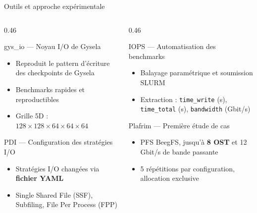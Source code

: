 \documentclass[svgnames,9pt,aspectratio=169]{beamer}
\begin{document}
\begin{frame}{Outils et approche expérimentale}

  \vspace{0.5em}

  \begin{columns}[t]
    \begin{column}{0.46\textwidth}
      \begin{block}{gys\_io --- Noyau I/O de Gysela}
        \begin{itemize}
          \item Reproduit le pattern d'écriture des checkpoints de Gysela
          \item Benchmarks rapides et reproductibles
          \item Grille 5D : $128 \times 128 \times 64 \times 64 \times 64$
        \end{itemize}
      \end{block}

      \vspace{0.8em}

      \begin{block}{PDI --- Configuration des stratégies I/O}
        \begin{itemize}
          \item Stratégies I/O changées via \textbf{fichier YAML}
          \item Single Shared File (SSF), Subfiling, File Per Process (FPP)
        \end{itemize}
      \end{block}
    \end{column}
    \begin{column}{0.46\textwidth}
      \begin{block}{IOPS --- Automatisation des benchmarks}
        \begin{itemize}
          \item Balayage paramétrique et soumission SLURM
          \item Extraction : \texttt{time\_write} (s), \texttt{time\_total} (s), \texttt{bandwidth} (Gbit/s)
        \end{itemize}
      \end{block}

      \vspace{0.8em}

      \begin{exampleblock}{Plafrim --- Première étude de cas}
        \begin{itemize}
          \item PFS BeegFS, jusqu'à \textbf{8 OST} et 12 Gbit/s de bande passante
          \item 5 répétitions par configuration, allocation exclusive
        \end{itemize}
      \end{exampleblock}
    \end{column}
  \end{columns}

\end{frame}
\end{document}
